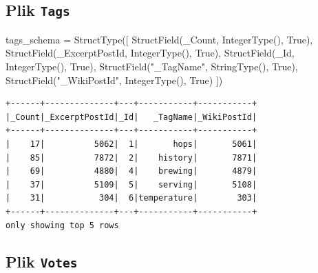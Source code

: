 \documentclass[
  letterpaper,
  DIV=11,
  numbers=noendperiod]{scrreprt}
\newenvironment{Shaded}{\begin{snugshade}}{\end{snugshade}}
\newcommand{\NormalTok}[1]{\textcolor[rgb]{0.00,0.23,0.31}{#1}}
\newcommand{\OperatorTok}[1]{\textcolor[rgb]{0.37,0.37,0.37}{#1}}
\newcommand{\StringTok}[1]{\textcolor[rgb]{0.13,0.47,0.30}{#1}}
\newcommand{\VariableTok}[1]{\textcolor[rgb]{0.07,0.07,0.07}{#1}}
\begin{document}
\hypertarget{plik-tags}{%
\subsection{\texorpdfstring{Plik
\texttt{Tags}}{Plik Tags}}\label{plik-tags}}

\small

\begin{Shaded}
\begin{Highlighting}[]
\NormalTok{tags\_schema }\OperatorTok{=}\NormalTok{ StructType([}
\NormalTok{    StructField(}\StringTok{\textquotesingle{}\_Count\textquotesingle{}}\NormalTok{, IntegerType(), }\VariableTok{True}\NormalTok{),}
\NormalTok{    StructField(}\StringTok{\textquotesingle{}\_ExcerptPostId\textquotesingle{}}\NormalTok{, IntegerType(), }\VariableTok{True}\NormalTok{),}
\NormalTok{    StructField(}\StringTok{\textquotesingle{}\_Id\textquotesingle{}}\NormalTok{, IntegerType(), }\VariableTok{True}\NormalTok{),}
\NormalTok{    StructField(}\StringTok{"\_TagName"}\NormalTok{, StringType(), }\VariableTok{True}\NormalTok{),}
\NormalTok{    StructField(}\StringTok{"\_WikiPostId"}\NormalTok{, IntegerType(), }\VariableTok{True}\NormalTok{)}
\NormalTok{])}
\end{Highlighting}
\end{Shaded}

\begin{verbatim}
+------+--------------+---+-----------+-----------+
|_Count|_ExcerptPostId|_Id|   _TagName|_WikiPostId|
+------+--------------+---+-----------+-----------+
|    17|          5062|  1|       hops|       5061|
|    85|          7872|  2|    history|       7871|
|    69|          4880|  4|    brewing|       4879|
|    37|          5109|  5|    serving|       5108|
|    31|           304|  6|temperature|        303|
+------+--------------+---+-----------+-----------+
only showing top 5 rows
\end{verbatim}

\normalsize

\hypertarget{plik-votes}{%
\subsection{\texorpdfstring{Plik
\texttt{Votes}}{Plik Votes}}\label{plik-votes}}

\small
\end{document}
